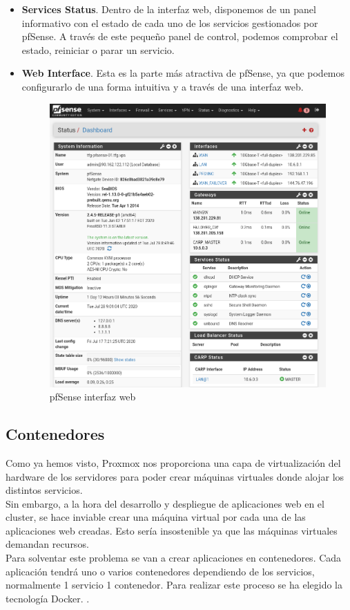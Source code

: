 \begin{text}
\begin{itemize}
					\item \textbf{Services Status}. Dentro de la interfaz web, disponemos de un panel informativo con el estado de cada uno de los servicios gestionados por pfSense. A través de este pequeño panel de control, podemos comprobar el estado, reiniciar o parar un servicio.
					\item \textbf{Web Interface}. Esta es la parte más atractiva de pfSense, ya que podemos configurarlo de una forma intuitiva y a través de una interfaz web.
					\begin{figure}[!hbt]
						\centering
						\includegraphics[scale=0.3]{imagenes/Diseno/pfsense_wui.png}
						\caption[pfSense interfaz web]{pfSense interfaz web} 
						\label{pfsense_wui}
					\end{figure}
				\end{itemize}
			\end{text}
		\clearpage
	\subsection{Contenedores}
		\begin{text}
			Como ya hemos visto, Proxmox nos proporciona una capa de virtualización del hardware de los servidores para poder crear máquinas virtuales donde alojar los distintos servicios. \\
			Sin embargo, a la hora del desarrollo y despliegue de aplicaciones web en el cluster, se hace inviable crear una máquina virtual por cada una de las aplicaciones web creadas. Esto sería insostenible ya que las máquinas virtuales demandan recursos. \\
			
			Para solventar este problema se van a crear aplicaciones en contenedores. Cada aplicación tendrá uno o varios contenedores dependiendo de los servicios, normalmente 1 servicio 1 contenedor. Para realizar este proceso se ha elegido la tecnología Docker. \cite{docker:online}.
		\end{text}
